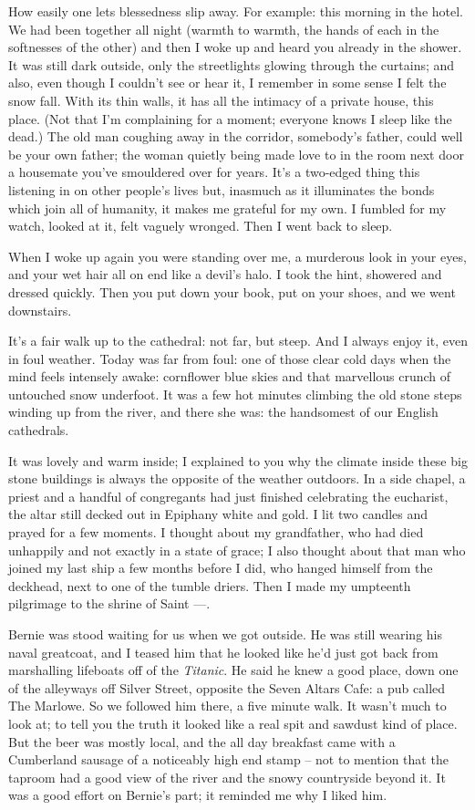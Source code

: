 How easily one lets blessedness slip away. For example: this morning in the hotel. We had been together all night (warmth to warmth, the hands of each in the softnesses of the other) and then I woke up and heard you already in the shower. It was still dark outside, only the streetlights glowing through the curtains; and also, even though I couldn't see or hear it, I remember in some sense I felt the snow fall. With its thin walls, it has all the intimacy of a private house, this place. (Not that I'm complaining for a moment; everyone knows I sleep like the dead.) The old man coughing away in the corridor, somebody's father, could well be your own father; the woman quietly being made love to in the room next door a housemate you've smouldered over for years. It's a two-edged thing this listening in on other people's lives but, inasmuch as it illuminates the bonds which join all of humanity, it makes me grateful for my own. I fumbled for my watch, looked at it, felt vaguely wronged. Then I went back to sleep.

When I woke up again you were standing over me, a murderous look in your eyes, and your wet hair all on end like a devil's halo. I took the hint, showered and dressed quickly. Then you put down your book, put on your shoes, and we went downstairs.

It's a fair walk up to the cathedral: not far, but steep. And I always enjoy it, even in foul weather. Today was far from foul: one of those clear cold days when the mind feels intensely awake: cornflower blue skies and that marvellous crunch of untouched snow underfoot. It was a few hot minutes climbing the old stone steps winding up from the river, and there she was: the handsomest of our English cathedrals.

It was lovely and warm inside; I explained to you why the climate inside these big stone buildings is always the opposite of the weather outdoors. In a side chapel, a priest and a handful of congregants had just finished celebrating the eucharist, the altar still decked out in Epiphany white and gold. I lit two candles and prayed for a few moments. I thought about my grandfather, who had died unhappily and not exactly in a state of grace; I also thought about that man who joined my last ship a few months before I did, who hanged himself from the deckhead, next to one of the tumble driers. Then I made my umpteenth pilgrimage to the shrine of Saint ---.

Bernie was stood waiting for us when we got outside. He was still wearing his naval greatcoat, and I teased him that he looked like he'd just got back from marshalling lifeboats off of the \textit{Titanic}. He said he knew a good place, down one of the alleyways off Silver Street, opposite the Seven Altars Cafe: a pub called The Marlowe. So we followed him there, a five minute walk. It wasn't much to look at; to tell you the truth it looked like a real spit and sawdust kind of place. But the beer was mostly local, and the all day breakfast came with a Cumberland sausage of a noticeably high end stamp -- not to mention that the taproom had a good view of the river and the snowy countryside beyond it. It was a good effort on Bernie's part; it reminded me why I liked him.

